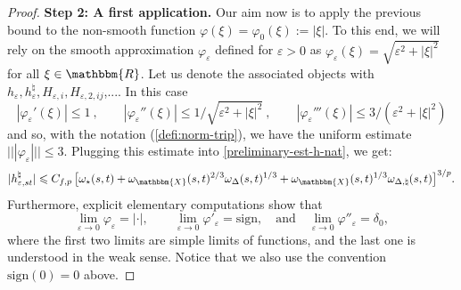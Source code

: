 \documentclass[11pt,reqno,oneside]{amsart}
\numberwithin{equation}{section}
\newcommand{\assign}{:=}
\newcommand{\tmtextbf}[1]{{\bfseries{#1}}}
\newcommand{\normtrip}[1]{|\! |\!  | #1 | \! |\!  |}
\newcommand{\ep}{\varepsilon}
\newcommand{\vp}{\varphi}
\begin{document}
\begin{proof}
  {\noindent}\tmtextbf{Step 2: A first application.} Our aim now is to apply the previous bound to the non-smooth function $\varphi(\xi)=\varphi_0 (\xi) \assign
  | \xi |$. To this end, we will rely on the smooth approximation
  $\varphi_{\varepsilon}$ defined for $\varepsilon > 0$ as
  $\varphi_{\varepsilon} (\xi) = \sqrt{\varepsilon^2 + | \xi |^2}$ for all
  $\xi \in \mathbbm{R}$. Let us denote the associated objects with
  $h_{\varepsilon}, h_{\varepsilon}^{\natural}, H_{\varepsilon,i},
  H_{\varepsilon, 2,ij}$,.... In this case
  \[ | \varphi_{\varepsilon}' (\xi) | \leqslant 1\ , \qquad |
     \varphi_{\varepsilon}'' (\xi) | \leqslant 1 / \sqrt{\varepsilon^2 + | \xi
     |^2} \ , \qquad | \varphi_{\varepsilon}''' (\xi) | \leqslant 3 /
     (\varepsilon^2 + | \xi |^2) \]
and so, with the notation (\ref{defi:norm-trip}), we have the uniform estimate $\normtrip{\varphi_{\varepsilon}} \leqslant 3$. 
Plugging this estimate into \eqref{preliminary-est-h-nat}, we get:
\begin{equation}\label{preliminary-est-h-nat-2}
	| h^{\natural}_{\varepsilon,st} | \leqslant  
	C_{f,p}\,  \big[ \omega_{\star} (s, t) 
	+\omega_{\mathbbm{X}} (s, t)^{2 / 3} \omega_{\Delta} (s, t)^{1/3}
	+ \omega_{\mathbbm{X}} (s, t)^{1 / 3} \omega_{\Delta,\natural} (s, t)\big]^{3 / p}.
		\end{equation}
Furthermore, explicit elementary computations show that
\begin{equation}\label{eq:lim-phi-eps}
\lim_{\ep\to 0} \vp_{\ep} = |\cdot|,
\qquad
\lim_{\ep\to 0} \vp'_{\ep} = \text{sign},
\quad\text{and}\quad
\lim_{\ep\to 0} \vp''_{\ep} = \delta_{0},
\end{equation}
where the first two limits are simple limits of functions, and the last one is understood in the weak sense. Notice that we also use the convention $\text{sign}(0)=0$ above.


\end{proof}
\end{document}
